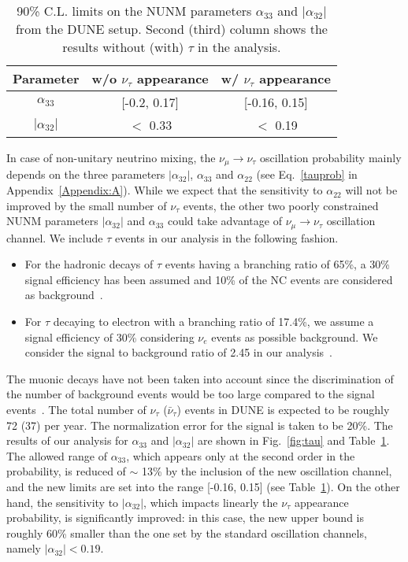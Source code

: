 \documentclass[11pt,a4paper]{article}
\newcommand{\capdef}{}
\newcommand{\mycaption}[2][\capdef]{\renewcommand{\capdef}{#2}
	\caption[#1]{{\footnotesize #2}}}
\begin{document}
\begin{table}
	\centering
	\begin{tabular}{|c|c|c|}
		\hline\hline
		Parameter & w/o $\nu_{\tau}$ appearance & w/ $\nu_\tau$ appearance\\ 
		\hline
		$\alpha_{33}$ & [-0.2, 0.17] & [-0.16, 0.15] \\
		\hline
		$|\alpha_{32}|$ & $<$ 0.33 & $<$ 0.19 \\
		\hline\hline
	\end{tabular}
	\mycaption{90\% C.L. limits on the NUNM parameters $\alpha_{33}$ and $|\alpha_{32}|$ from the DUNE setup.
		Second (third) column shows the results without (with) $\tau$ in the analysis.}	
		\label{tab:DUNE_taus}
\end{table}
In case of non-unitary neutrino mixing, the $\nu_\mu\to\nu_\tau$ oscillation probability mainly depends on the three parameters $|\alpha_{32}|$, $\alpha_{33}$ and $\alpha_{22}$ (see Eq.~\ref{tauprob} in Appendix~\ref{Appendix:A}). While we expect that the sensitivity to $\alpha_{22}$ will not be improved by the small number of $\nu_\tau$ events, the other two poorly constrained NUNM parameters $|\alpha_{32}|$ and $\alpha_{33}$ could take advantage of $\nu_\mu\to\nu_\tau$ oscillation channel. We include $\tau$ events in our analysis in the following fashion.
\begin{itemize}
    \item For the hadronic decays of $\tau$ events having a branching ratio of 65\%, a 30\% signal efficiency has been assumed and 10\% of the NC events are considered as background~\cite{DeGouvea:2019kea}.
   
    \item For $\tau$ decaying to electron with a branching ratio of 17.4\%, we assume a signal efficiency of 30\% considering $\nu_e$ events as possible background. We consider the signal to background ratio of 2.45 in our analysis~\cite{Ghoshal:2019pab}.
    
\end{itemize}
The muonic decays have not been taken into account since the discrimination of the number of background events would be too large compared to the signal events~\cite{DeGouvea:2019kea,Ghoshal:2019pab}. The total number of $\nu_\tau$ ($\bar{\nu}_\tau$) events in DUNE is expected to be roughly 72 (37) per year.
The normalization error for the signal is taken to be 20\%. The results of our analysis for $\alpha_{33}$ and $|\alpha_{32}|$ are shown in Fig.~\ref{fig:tau} and Table~\ref{tab:DUNE_taus}. The allowed range of $\alpha_{33}$, which appears only at the second order in the probability, is reduced of $\sim$ 13\% by the inclusion of the new oscillation channel, and the new limits are set into the range [-0.16, 0.15] (see Table~\ref{tab:DUNE_taus}). On the other hand, the sensitivity to $|\alpha_{32}|$, which impacts linearly the $\nu_\tau$ appearance probability, is significantly improved: in this case, the new upper bound is roughly 60\% smaller than the one set by the standard oscillation channels, namely $|\alpha_{32}|<0.19$. 
\end{document}
